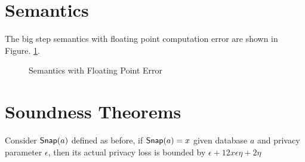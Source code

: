 \documentclass[a4paper,11pt]{article}
\begin{document}
\section{Semantics}
The big step semantics with floating point computation error are shown in Figure. \ref{fig_semantics}.
\begin{figure}
\caption{Semantics with Floating Point Error}
\label{fig_semantics}
\end{figure}



\section{Soundness Theorems}


\begin{thm}
Consider $\mathsf{Snap}(a)$ defined as before, if $\mathsf{Snap}(a) = x$ given database $a$ and privacy parameter $\epsilon$, then its actual privacy loss is bounded by $\epsilon + 12 x \epsilon \eta + 2\eta$
\end{thm}
\end{document}

